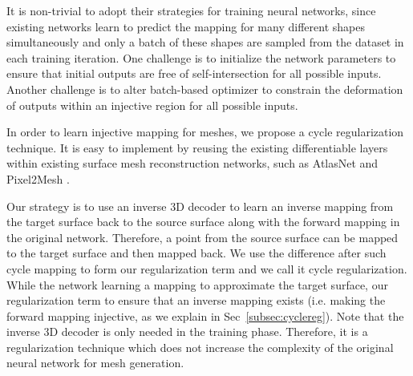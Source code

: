 
It is non-trivial to adopt their strategies for training neural networks, since existing networks learn to predict the mapping for many different shapes simultaneously and only a batch of these shapes are sampled from the dataset in each training iteration. One challenge is to initialize the network parameters to ensure that initial outputs are free of self-intersection for all possible inputs. Another challenge is to alter batch-based optimizer to constrain the deformation of outputs within an injective region for all possible inputs. 

In order to learn injective mapping for meshes, we propose a cycle regularization technique.  It is easy to implement by reusing the existing differentiable layers within existing surface mesh reconstruction networks, such as AtlasNet \cite{atlasnet} and Pixel2Mesh \cite{pixel2mesh}.

 Our strategy is to use an inverse 3D decoder to learn an inverse mapping from  the target surface back to the source surface along with the forward mapping in the original network. Therefore, a point from the source surface can be mapped to the target surface and then mapped back. We use the difference after such cycle mapping to form our regularization term and we call it cycle regularization. While the network learning a mapping to approximate the target surface, our regularization term  to ensure that an inverse mapping exists (i.e. making the forward mapping injective, as we explain in Sec~\ref{subsec:cyclereg}).
Note that the inverse 3D decoder is only needed in the training phase. Therefore, it is a regularization technique which does not increase the complexity of the original neural network for mesh generation.

